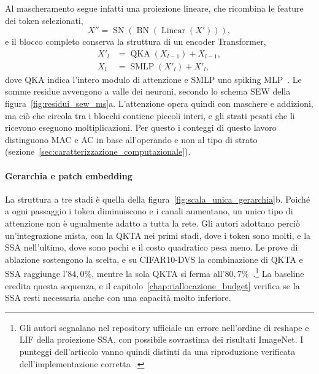Al mascheramento segue infatti una proiezione lineare, che ricombina le feature dei token selezionati,
\begin{equation}
\label{eq:qk_proiezione_lineare_uscita}
X'' = \operatorname{SN} \left( \operatorname{BN} \left( \operatorname{Linear}(X') \right) \right),
\end{equation}
e il blocco completo conserva la struttura di un encoder Transformer,
\begin{align}
\label{eq:blocco_qkformer_qka}
X'_l &= \operatorname{QKA}(X_{l-1}) + X_{l-1}, \\
\label{eq:blocco_qkformer_smlp}
X_l &= \operatorname{SMLP}(X'_l) + X'_l,
\end{align}
dove QKA indica l'intero modulo di attenzione e SMLP uno spiking MLP~\cite{zhou2024qkformer}. Le somme residue avvengono a valle dei neuroni, secondo lo schema SEW della figura~\ref{fig:residui_sew_ms}a. L'attenzione opera quindi con maschere e addizioni, ma ciò che circola tra i blocchi contiene piccoli interi, e gli strati pesati che li ricevono eseguono moltiplicazioni. Per questo i conteggi di questo lavoro distinguono MAC e AC in base all'operando e non al tipo di strato (sezione~\ref{sec:caratterizzazione_computazionale}).

\paragraph{Gerarchia e patch embedding}
\label{subsec:gerarchia_patch}

La struttura a tre stadi è quella della figura~\ref{fig:scala_unica_gerarchia}b. Poiché a ogni passaggio i token diminuiscono e i canali aumentano, un unico tipo di attenzione non è ugualmente adatto a tutta la rete. Gli autori adottano perciò un'integrazione mista, con la QKTA nei primi stadi, dove i token sono molti, e la SSA nell'ultimo, dove sono pochi e il costo quadratico pesa meno. Le prove di ablazione sostengono la scelta, e su CIFAR10-DVS la combinazione di QKTA e SSA raggiunge l'$84{,}0\%$, mentre la sola QKTA si ferma all'$80{,}7\%$~\cite{zhou2024qkformer}.\footnote{Gli autori segnalano nel repository ufficiale un errore nell'ordine di reshape e LIF della proiezione SSA, con possibile sovrastima dei risultati ImageNet. I punteggi dell'articolo vanno quindi distinti da una riproduzione verificata dell'implementazione corretta~\cite{qkformerImplementationNotice}.} La baseline eredita questa sequenza, e il capitolo~\ref{chap:riallocazione_budget} verifica se la SSA resti necessaria anche con una capacità molto inferiore.

